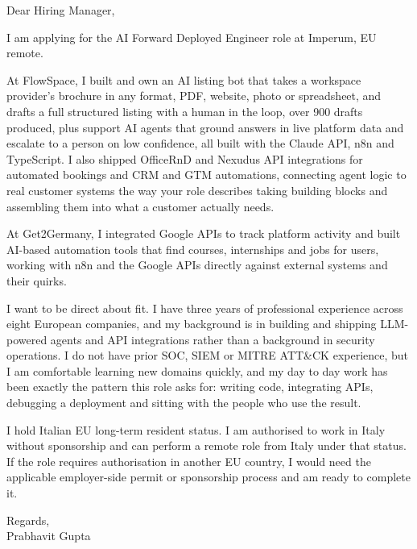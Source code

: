 \documentclass[a4paper,11pt]{article}
\begin{document}
Dear Hiring Manager,

I am applying for the AI Forward Deployed Engineer role at Imperum, EU remote.

At FlowSpace, I built and own an AI listing bot that takes a workspace provider's brochure in any format, PDF, website, photo or spreadsheet, and drafts a full structured listing with a human in the loop, over 900 drafts produced, plus support AI agents that ground answers in live platform data and escalate to a person on low confidence, all built with the Claude API, n8n and TypeScript. I also shipped OfficeRnD and Nexudus API integrations for automated bookings and CRM and GTM automations, connecting agent logic to real customer systems the way your role describes taking building blocks and assembling them into what a customer actually needs.

At Get2Germany, I integrated Google APIs to track platform activity and built AI-based automation tools that find courses, internships and jobs for users, working with n8n and the Google APIs directly against external systems and their quirks.

I want to be direct about fit. I have three years of professional experience across eight European companies, and my background is in building and shipping LLM-powered agents and API integrations rather than a background in security operations. I do not have prior SOC, SIEM or MITRE ATT\&CK experience, but I am comfortable learning new domains quickly, and my day to day work has been exactly the pattern this role asks for: writing code, integrating APIs, debugging a deployment and sitting with the people who use the result.

I hold Italian EU long-term resident status. I am authorised to work in Italy without sponsorship and can perform a remote role from Italy under that status. If the role requires authorisation in another EU country, I would need the applicable employer-side permit or sponsorship process and am ready to complete it.

Regards,\\
Prabhavit Gupta
\end{document}
